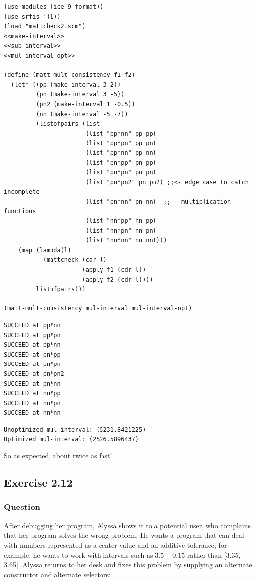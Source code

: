 \documentclass[final,fleqn,titlepage,twoside]{article}
\begin{document}
\begin{verbatim}
(use-modules (ice-9 format))
(use-srfis '(1))
(load "mattcheck2.scm")
<<make-interval>>
<<sub-interval>>
<<mul-interval-opt>>

(define (matt-mult-consistency f1 f2)
  (let* ((pp (make-interval 3 2))
         (pn (make-interval 3 -5))
         (pn2 (make-interval 1 -0.5))
         (nn (make-interval -5 -7))
         (listofpairs (list
                       (list "pp*nn" pp pp)
                       (list "pp*pn" pp pn)
                       (list "pp*nn" pp nn)
                       (list "pn*pp" pn pp)
                       (list "pn*pn" pn pn)
                       (list "pn*pn2" pn pn2) ;;<- edge case to catch incomplete
                       (list "pn*nn" pn nn)  ;;   multiplication functions
                       (list "nn*pp" nn pp)
                       (list "nn*pn" nn pn)
                       (list "nn*nn" nn nn))))
    (map (lambda(l)
           (mattcheck (car l)
                      (apply f1 (cdr l))
                      (apply f2 (cdr l))))
         listofpairs)))

(matt-mult-consistency mul-interval mul-interval-opt)
\end{verbatim}

\begin{verbatim}
SUCCEED at pp*nn
SUCCEED at pp*pn
SUCCEED at pp*nn
SUCCEED at pn*pp
SUCCEED at pn*pn
SUCCEED at pn*pn2
SUCCEED at pn*nn
SUCCEED at nn*pp
SUCCEED at nn*pn
SUCCEED at nn*nn
\end{verbatim}

\begin{verbatim}
Unoptimized mul-interval: (5231.8421225)
Optimized mul-interval: (2526.5896437)
\end{verbatim}

So as expected, about twice as fast!

\subsection{Exercise 2.12}
\label{sec:orgeb573f5}
\subsubsection{Question}
\label{sec:orgac71672}
After debugging her program, Alyssa shows it to a potential user, who complains
that her program solves the wrong problem. He wants a program that can deal with
numbers represented as a center value and an additive tolerance; for example, he
wants to work with intervals such as \(3.5 \pm 0.15\) rather than [3.35, 3.65].
Alyssa returns to her desk and fixes this problem by supplying an alternate
constructor and alternate selectors:
\end{document}
